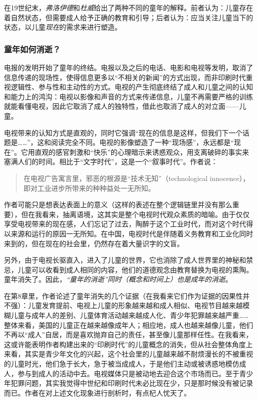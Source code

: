 在19世纪末，\emph{弗洛伊德}和\emph{杜威}给出了两种不同的童年的解释。前者认为：儿童存在着自然状态，但需要成人给予正确的教育和引导；后者认为：应当关注儿童当下的状态，以儿童\emph{现在}的需求来进行塑造。

\subsubsection{童年如何消逝？}
电报的发明开始了童年的终结。电报以及之后的电话、电影和电视等发明，取消了信息传递的现场性，使得信息更多以“不相关的新闻”的方式出现，而非印刷时代重视逻辑性、参与性和主动性的方式。电视的产生彻底终结了成人和儿童之间的认知和能力上的鸿沟：电视以影像和声音的方式来传递信息，儿童不再需要严格的训练就能看懂电视，因此它取消了成人的独特性，借此也取消了成人的对立面——儿童。

电视带来的认知方式是直观的，同时它强调“现在的信息是这样，但我们下一个话题是……”，这和阅读完全不同。电视的影像塑造了一种“现场感”，永远都是“现在”。它用直观的感官刺激和“快乐”的心理暗示来诱惑观众，用支离破碎的事实来塞满人们的时间。相比于“文字时代”，这是一个“叙事时代”。作者说：
\begin{quotation}
在电视广告寓言里，邪恶的根源是“技术无知”（technological innocence），即对工业进步所带来的种种益处一无所知。
\end{quotation}

作者可能只是想表达表面上的意义（这样的表述在整个逻辑链里并没有那么重要），但在我看来，抽离语境，这其实是整个电视时代观众素质的暗喻。由于仅仅享受电视带来的现在感，人们忘记了过去，陶醉于这个工业时代，而对这个时代得以来源和运行的原因一无所知。在中国，电视时代是伴随着义务教育和工业化同时来到的，但在现在的社会里，仍然存在着大量识字的文盲。

另外，由于电视长驱直入，进入了儿童的世界，它也消除了成人世界里的神秘和禁忌，儿童可以收看到成人相同的内容，他们的道德观念由教育替换为电视的熏陶。童年消失了。因此，\emph{“童年的消逝”同时（概念和时间上）也是成年的消逝}。

在第8章里，作者论述了童年消失的几个证据（在我看来它们作为证据的因果性并不强）：儿童发育提前、电视上儿童的形象越来越和成人相似、电视节目越来越模糊儿童与成年人的差别、儿童体育活动越来越成人化、青少年犯罪越来越严重……整体来看，美国的儿童正在越来越像成年人；相应地，成人也越来越像儿童，他们不再以“成人”自居，而是喜欢抛弃自己的责任，甚至像儿童那样任性。在我看来，这或许能表明作者构建出来的“印刷时代”的儿童概念的消失，但从社会整体角度上来看，其实是青少年文化的兴起，这个社会里的儿童越来越不耐烦漫长的不被重视的儿童时光，他们急于长大，急于被当成成人，于是他们主动或被诱惑地模仿成人，参与到成人的活动中去。电视媒体只是被动地去迎合这个市场而已。至于青少年犯罪问题，其实我觉得中世纪和印刷时代未必比现在少，只是那时候没有被记录而已。作者在对上述文化现象进行剖析时，有点杞人忧天了。

